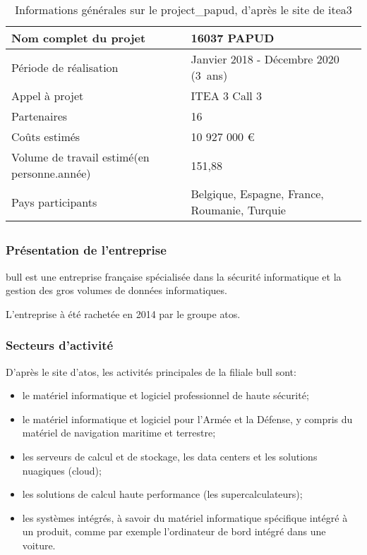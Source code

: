\begin{table}[h]{
	\centering
	\renewcommand{\arraystretch}{1.5}
	\setlength\tabcolsep{1em}
	\begin{tabularx}{\textwidth}{|X|l|}
		\hline
		Nom complet du projet & 16037 PAPUD\\
		\hline
		Période de réalisation & Janvier 2018 - Décembre 2020 (3~ans)\\
		\hline
		Appel à projet & ITEA 3 Call 3\\
		\hline
		Partenaires & 16\\
		\hline
		Coûts estimés & 10 927 000 €\\
		\hline
		Volume de travail estimé\newline (en personne.année) & 151,88 \\
		\hline
		Pays participants & Belgique, Espagne, France, \mbox{Roumanie}, Turquie\\
		\hline
	\end{tabularx}
	\renewcommand{\arraystretch}{1}}
	\caption[Informations générales sur le \gls{project_papud}, d'après le site de \gls{itea3}]{Informations générales sur le \gls{project_papud}, d'après le site de \gls{itea3} \autocite{about_papud} \label{tab:about_papud}}
\end{table}

\subsection{}
\subsubsection*{Présentation de l'entreprise}
\gls{bull} est une entreprise française spécialisée dans la sécurité informatique et la gestion des gros volumes de données informatiques. 

L'entreprise à été rachetée en 2014 par le groupe \gls{atos}.

\subsubsection*{Secteurs d'activité}
D'après {le site d'\gls{atos}\autocite{bull_produits}}, les activités principales de la filiale \gls{bull} sont:
\begin{itemize}
	\item le matériel informatique et logiciel professionnel de haute sécurité;
	\item le matériel informatique et logiciel pour l'Armée et la Défense, y compris du matériel de navigation maritime et terrestre;
	\item les serveurs de calcul et de stockage, les \gls{data centers} et les solutions nuagiques (\gls{cloud});
	\item les solutions de calcul haute performance (les \og supercalculateurs\fg{});
	\item les systèmes intégrés, à savoir du matériel informatique spécifique intégré à un produit, comme par exemple l'ordinateur de bord intégré dans une voiture.
\end{itemize}
\vspace{1em}

